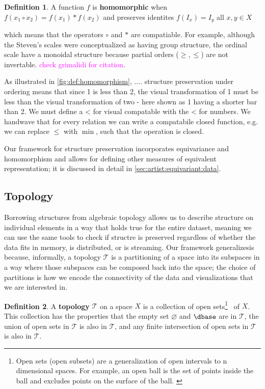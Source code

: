 \documentclass[journal]{IEEEtran}
\newcommand{\note}[1]{\textcolor{magenta}{#1}}
\theoremstyle{definition}
\newtheorem{definition}{Definition}[section]
\theoremstyle{remark}
\begin{document}
\begin{definition}\label{def:homomorphism}
  A function $f$ is \textbf{homomorphic} when $f(x_1 \circ x_2) = f(x_1) * f(x_2)$ and preserves identites $f(I_x) = I_y$ all $x, y \in X$

\end{definition}
which means that the operators $\circ$ and $*$ are compatiable. For example, although the Steven's scales were conceptualized as having group structure, the ordinal scale have a monoidal structure because partial orders ($\geq, \leq$) are not invertable. \note{check grimalidi for citation}.

As illustrated in \ref{fig:def:homomorphism}, .... structure preservation under ordering means that since 1 is less than 2, the visual transformation of 1 must be less than the visual transformation of two - here shown as 1 having a shorter bar than 2. We must define a < for visual compatable with the < for numbers. We handwave that for every relation we can write a compatabile closed function,  e.g. we can replace $\leq$ with $\min$, such that the operation is closed.




Our framework for structure preservation incorporates equivariance and homomorphism and allows for defining other measures of equivalent representation; it is discussed in detail in \autoref{sec:artist:equivariant:data}.


\subsection{Topology}
Borrowing structures from algebraic topology allows us to describe structure on individual elements in a way that holds true for the entire dataset, meaning we can use the same tools to check if structre is preserved regardless of whether the data fits in memory, is distributed, or is streaming. Our framework generalizesis because, informally, a topology $\mathcal{T}$ is a partitioning of a space into its subspaces in a way where those subspaces can be composed back into the space; the choice of partitions is how we encode the connectivity of the data and visualizations that we are interested in.

\begin{definition}
A \textbf{topology} $\mathcal{T}$ on a space $X$ is a collection of open sets\footnote{Open sets (open subsets) are a generalization of open intervals to n dimensional spaces. For example, an open ball is the set of points inside the ball and excludes points on the surface of the ball. \cite{weissteinOpenSet,bradleyTopologyVsTopology}} \openset\ of $X$. This collection has the properties that the empty set $\varnothing$ and $\dbase$ are in $\mathcal{T}$, the union of open sets in $\mathcal{T}$ is also in $\mathcal{T}$, and any finite intersection of open sets in $\mathcal{T}$ is also in $\mathscr{T}$. \cite{bradleyTopologyCategoricalApproach2020}
\end{definition}
\end{document}
